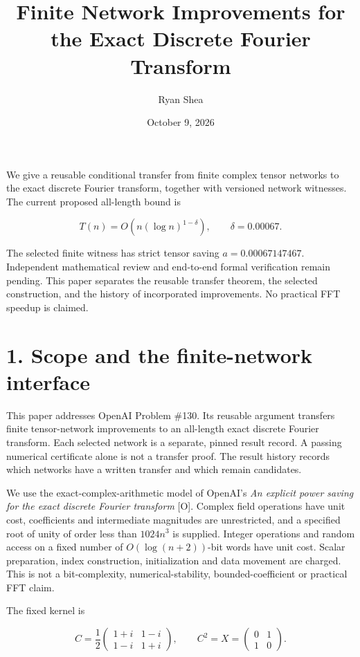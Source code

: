 \documentclass[
  11pt,
]{article}
\title{Finite Network Improvements for the Exact Discrete Fourier
Transform}
\author{Ryan Shea}
\date{October 9, 2026}
\begin{document}
\maketitle

We give a reusable conditional transfer from finite complex tensor
networks to the exact discrete Fourier transform, together with
versioned network witnesses. The current proposed all-length bound is

\[
\boxed{T(n)=O\!\left(n(\log n)^{1-\delta}\right),\qquad
\delta=0.00067.}
\]

The selected finite witness has strict tensor saving
\(a=0.00067147467\). Independent mathematical review and end-to-end
formal verification remain pending. This paper separates the reusable
transfer theorem, the selected construction, and the history of
incorporated improvements. No practical FFT speedup is claimed.

\section{1. Scope and the finite-network
interface}\label{scope-and-the-finite-network-interface}

This paper addresses OpenAI Problem \#130. Its reusable argument
transfers finite tensor-network improvements to an all-length exact
discrete Fourier transform. Each selected network is a separate, pinned
result record. A passing numerical certificate alone is not a transfer
proof. The result history records which networks have a written transfer
and which remain candidates.

We use the exact-complex-arithmetic model of OpenAI's \emph{An explicit
power saving for the exact discrete Fourier transform} {[}O{]}. Complex
field operations have unit cost, coefficients and intermediate
magnitudes are unrestricted, and a specified root of unity of order less
than \(1024n^3\) is supplied. Integer operations and random access on a
fixed number of \(O(\log(n+2))\)-bit words have unit cost. Scalar
preparation, index construction, initialization and data movement are
charged. This is not a bit-complexity, numerical-stability,
bounded-coefficient or practical FFT claim.

The fixed kernel is

\[
C=\frac12\begin{pmatrix}1+i&1-i\\1-i&1+i\end{pmatrix},
\qquad C^2=X=\begin{pmatrix}0&1\\1&0\end{pmatrix}.
\]
\end{document}
